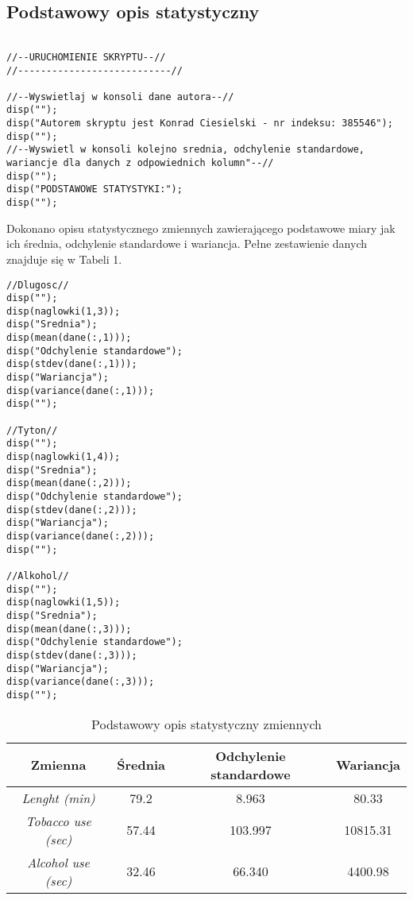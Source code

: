 \documentclass[a4paper, 11pt]{article}
\begin{document}
\subsection{Podstawowy opis statystyczny}
\begin{lstlisting}

//--URUCHOMIENIE SKRYPTU--//
//---------------------------//

//--Wyswietlaj w konsoli dane autora--//
disp("");
disp("Autorem skryptu jest Konrad Ciesielski - nr indeksu: 385546");
disp("");
//--Wyswietl w konsoli kolejno srednia, odchylenie standardowe, wariancje dla danych z odpowiednich kolumn"--//
disp("");
disp("PODSTAWOWE STATYSTYKI:");
disp("");
\end{lstlisting}
\-\hspace{8mm}Dokonano opisu statystycznego zmiennych zawierającego podstawowe miary jak ich średnia, odchylenie standardowe i wariancja. Pełne zestawienie danych znajduje się w Tabeli 1.
\begin{lstlisting}
//Dlugosc//
disp("");
disp(naglowki(1,3));
disp("Srednia");
disp(mean(dane(:,1)));
disp("Odchylenie standardowe");
disp(stdev(dane(:,1)));
disp("Wariancja");
disp(variance(dane(:,1)));
disp("");

//Tyton//
disp("");
disp(naglowki(1,4));
disp("Srednia");
disp(mean(dane(:,2)));
disp("Odchylenie standardowe");
disp(stdev(dane(:,2)));
disp("Wariancja");
disp(variance(dane(:,2)));
disp("");

//Alkohol//
disp("");
disp(naglowki(1,5));
disp("Srednia");
disp(mean(dane(:,3)));
disp("Odchylenie standardowe");
disp(stdev(dane(:,3)));
disp("Wariancja");
disp(variance(dane(:,3)));
disp("");
\end{lstlisting}

 \begin{table}[h]
\centering
\caption{Podstawowy opis statystyczny zmiennych}
\begin{tabular}{|cccc|}
\hline
\multicolumn{1}{|c|}{\textbf{Zmienna}} & \multicolumn{1}{c|}{\textbf{Średnia}} & \multicolumn{1}{c|}{\textbf{Odchylenie standardowe}} & \textbf{Wariancja} \\ \hline
\textit{Lenght (min)}                  & 79.2                                  & 8.963                                                & 80.33              \\
\textit{Tobacco use (sec)}             & 57.44                                 & 103.997                                              & 10815.31           \\
\textit{Alcohol use (sec)}             & 32.46                                 & 66.340                                               & 4400.98            \\ \hline
\end{tabular}
\end{table}
\end{document}
